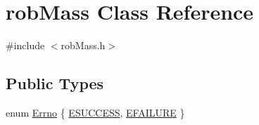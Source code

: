 \hypertarget{classrob_mass}{}\section{rob\+Mass Class Reference}
\label{classrob_mass}


{\ttfamily \#include $<$rob\+Mass.\+h$>$}

\subsection*{Public Types}
\begin{DoxyCompactItemize}
\item 
enum \hyperlink{classrob_mass_a85e715c568a7c8b1fff957b046164649}{Errno} \{ \hyperlink{classrob_mass_a85e715c568a7c8b1fff957b046164649add68e16ef430713d59f0adb01b14b94e}{E\+S\+U\+C\+C\+E\+S\+S}, 
\hyperlink{classrob_mass_a85e715c568a7c8b1fff957b046164649a73f4b04ad9d26f8bd81f6bdc9cee9a66}{E\+F\+A\+I\+L\+U\+R\+E}
 \}
\end{DoxyCompactItemize}
